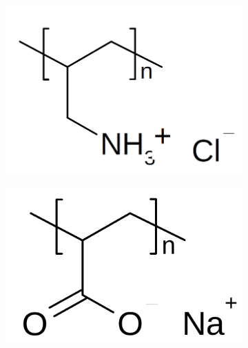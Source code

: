 \documentclass[journal=mamobx,manuscript=article]{achemso}
\begin{document}
\begin{figure}[H]
    \begin{subfigure}[b]{0.3\textwidth}
        \includegraphics[scale=0.4]{fig1A.png}
        \caption{}
        \label{fig:A}
    \end{subfigure}
    \begin{subfigure}[b]{0.3\textwidth}
        \includegraphics[scale=0.25]{fig1B.png}
        \caption{}
        \label{fig:B}
    \end{subfigure}
    \begin{subfigure}[b]{0.3\textwidth}

\end{subfigure}
\end{figure}
\end{document}
